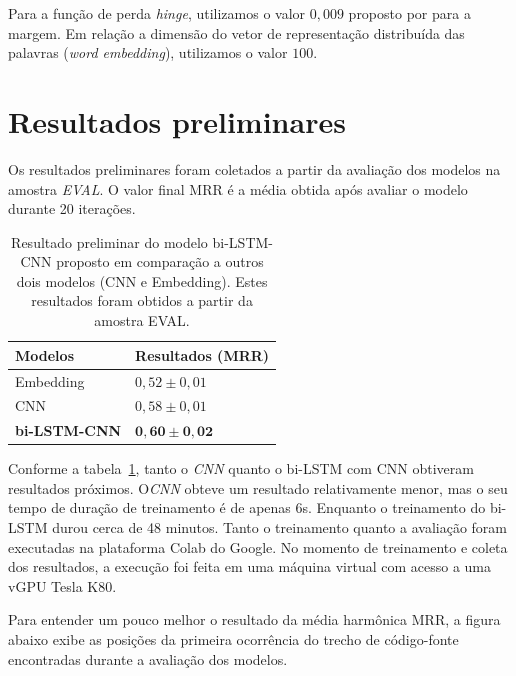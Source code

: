 Para a função de perda \textit{hinge}, utilizamos o valor $0,009$ proposto por \cite{feng-2015} para a margem. Em relação a dimensão do vetor de representação distribuída das palavras (\textit{word embedding}), utilizamos o valor $100$.


\section{Resultados preliminares}

Os resultados preliminares foram coletados a partir da avaliação dos modelos na amostra \emph{EVAL}. O valor final MRR é a média obtida após avaliar o modelo durante 20 iterações. 

\begin{table}[h]
\centering
\begin{tabular}{ p{3cm} p{3cm} }
 \hline
 \textbf{Modelos} & \textbf{Resultados (MRR)}\\
 \hline
 Embedding & $0,52 \pm 0,01$\\
 
 CNN & $0,58 \pm 0,01 $ \\
 
 \textbf{bi-LSTM-CNN} & $\bm{0,60} \pm \bm{0,02}$\\
 \hline
\end{tabular}
\caption{Resultado preliminar do modelo bi-LSTM-CNN proposto em comparação a outros dois modelos (CNN e Embedding). Estes resultados foram obtidos a partir da amostra EVAL.}
\label{table:resultados-preliminares}
\end{table}

Conforme a tabela~\ref{table:resultados-preliminares}, tanto o \emph{CNN} quanto o bi-LSTM com CNN obtiveram resultados próximos. O\emph{CNN} obteve um resultado relativamente menor, mas o seu tempo de duração de treinamento é de apenas 6s. Enquanto o treinamento do bi-LSTM durou cerca de 48 minutos. Tanto o treinamento quanto a avaliação foram executadas na plataforma Colab  do Google. No momento de treinamento e coleta dos resultados, a execução foi feita em uma máquina virtual com acesso a uma vGPU  Tesla K80.

Para entender um pouco melhor o resultado da média harmônica MRR, a figura abaixo exibe as posições da primeira ocorrência do trecho de código-fonte encontradas durante a avaliação dos modelos.


